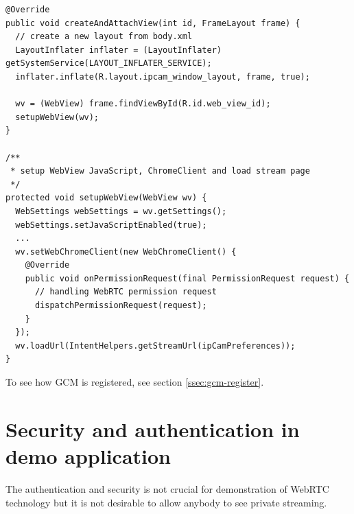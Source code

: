 \begin{lstlisting}
@Override
public void createAndAttachView(int id, FrameLayout frame) {
  // create a new layout from body.xml
  LayoutInflater inflater = (LayoutInflater) getSystemService(LAYOUT_INFLATER_SERVICE);
  inflater.inflate(R.layout.ipcam_window_layout, frame, true);

  wv = (WebView) frame.findViewById(R.id.web_view_id);
  setupWebView(wv);
}

/**
 * setup WebView JavaScript, ChromeClient and load stream page
 */
protected void setupWebView(WebView wv) {
  WebSettings webSettings = wv.getSettings();
  webSettings.setJavaScriptEnabled(true);
  ...
  wv.setWebChromeClient(new WebChromeClient() {
    @Override
    public void onPermissionRequest(final PermissionRequest request) {
      // handling WebRTC permission request
      dispatchPermissionRequest(request);
    }
  });
  wv.loadUrl(IntentHelpers.getStreamUrl(ipCamPreferences));
}
\end{lstlisting}

\noindent
To see how GCM is registered, see section \ref{ssec:gcm-register}.














\newpage
\section{Security and authentication in demo application}
The authentication and security is not crucial for demonstration of WebRTC technology but it is not desirable to allow anybody to see private streaming.

